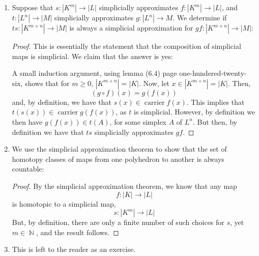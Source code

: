 \documentclass{book}
\DeclareMathOperator*{\N}{\mathbb{N}}
\DeclareMathOperator*{\car}{\text{carrier}}
\begin{document}
\begin{enumerate}[(1)]
    \item Suppose that $s: |K^m| \rightarrow |L|$ simplicially approximates $f: |K^m| \rightarrow |L|$, and $t: |L^n| \rightarrow |M|$ simplicially approximates $g: |L^n| \rightarrow M$. We determine if $ts: |K^{m+n}| \rightarrow |M|$ is always a simplicial approximation for $gf: |K^{m+n}| \rightarrow |M|$:   
        \begin{proof} This is essentially the statement that the composition of simplicial maps is simplicial. We claim that the answer is yes:
            \par A small induction argument, using lemma ($6.4$) page one-hundered-twenty-six, shows that for $m \geq 0$, $|K^{m+n}| = |K|$. Now, let $x \in |K^{m+n}| = |K|$. Then, 
            \[(g \circ f)(x) = g(f(x)) \]
            and, by definition, we have that $s(x) \in \car f(x)$. This implies that $t(s(x)) \in \car g(f(x))$, as $t$ is simplicial. However, by definition we then have $g(f(x)) \in t(A)$, for some simplex $A$ of $L^n$. But then, by definition we have that $ts$ simplicially approximates $gf$. 
        \end{proof}

    \item We use the simplicial approximation theorem to show that the set of homotopy classes of maps from one polyhedron to another is always countable: 
        \begin{proof} By the simplicial approximation theorem, we know that any map 
            \[f: |K| \rightarrow |L|\]
            is homotopic to a simplicial map, 
            \[s: |K^m| \rightarrow |L|\]
            But, by definition, there are only a finite number of such choices for $s$, yet $m \in \N$, and the result follows. 
        \end{proof}

    \item This is left to the reader as an exercise. 

\end{enumerate}
\end{document}
